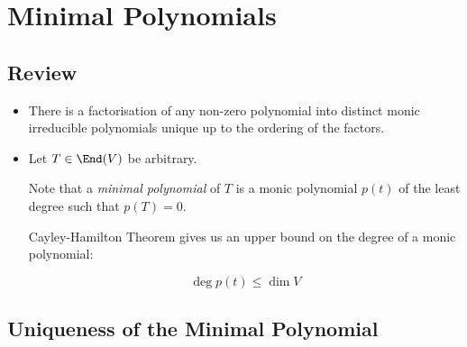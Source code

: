 \documentclass[11pt]{scrartcl}
\begin{document}
\section{Minimal Polynomials}

\subsection{Review}
\begin{itemize}
\item There is a factorisation of any non-zero polynomial into
  distinct monic irreducible polynomials unique up to the ordering of
  the factors.
\item 

Let $T \in \End(V)$ be arbitrary.

Note that a \textit{minimal polynomial} of $T$ is a monic polynomial $p(t)$ of the least degree such that $p(T) = 0$.

Cayley-Hamilton Theorem gives us an upper bound on the degree of a monic polynomial:

\begin{equation*}
\deg p(t) \leq \dim V
\end{equation*}
\end{itemize} 

\subsection{Uniqueness of the Minimal Polynomial}
\end{document}
